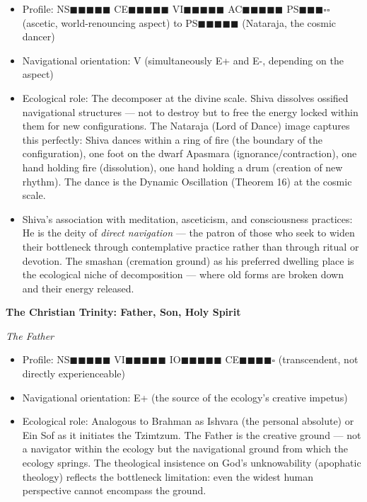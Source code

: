 \begin{itemize}[nosep,leftmargin=*]
  \item Profile: NS$\blacksquare$$\blacksquare$$\blacksquare$$\blacksquare$$\blacksquare$ CE$\blacksquare$$\blacksquare$$\blacksquare$$\blacksquare$$\blacksquare$ VI$\blacksquare$$\blacksquare$$\blacksquare$$\blacksquare$$\blacksquare$ AC$\blacksquare$$\blacksquare$$\blacksquare$$\blacksquare$$\blacksquare$ PS$\blacksquare$$\blacksquare$$\blacksquare$$\square$$\square$ (ascetic, world-renouncing aspect) to PS$\blacksquare$$\blacksquare$$\blacksquare$$\blacksquare$$\blacksquare$ (Nataraja, the cosmic dancer)
  \item Navigational orientation: V (simultaneously E+ and E-, depending on the aspect)
  \item Ecological role: The decomposer at the divine scale. Shiva dissolves ossified navigational structures — not to destroy but to free the energy locked within them for new configurations. The Nataraja (Lord of Dance) image captures this perfectly: Shiva dances within a ring of fire (the boundary of the configuration), one foot on the dwarf Apasmara (ignorance/contraction), one hand holding fire (dissolution), one hand holding a drum (creation of new rhythm). The dance is the Dynamic Oscillation (Theorem 16) at the cosmic scale.
  \item Shiva's association with meditation, asceticism, and consciousness practices: He is the deity of \textit{direct navigation} — the patron of those who seek to widen their bottleneck through contemplative practice rather than through ritual or devotion. The smashan (cremation ground) as his preferred dwelling place is the ecological niche of decomposition — where old forms are broken down and their energy released.
\end{itemize}


\textbf{The Christian Trinity: Father, Son, Holy Spirit}


\textit{The Father}

\begin{itemize}[nosep,leftmargin=*]
  \item Profile: NS$\blacksquare$$\blacksquare$$\blacksquare$$\blacksquare$$\blacksquare$ VI$\blacksquare$$\blacksquare$$\blacksquare$$\blacksquare$$\blacksquare$ IO$\blacksquare$$\blacksquare$$\blacksquare$$\blacksquare$$\blacksquare$ CE$\blacksquare$$\blacksquare$$\blacksquare$$\blacksquare$$\square$ (transcendent, not directly experienceable)
  \item Navigational orientation: E+ (the source of the ecology's creative impetus)
  \item Ecological role: Analogous to Brahman as Ishvara (the personal absolute) or Ein Sof as it initiates the Tzimtzum. The Father is the creative ground — not a navigator within the ecology but the navigational ground from which the ecology springs. The theological insistence on God's unknowability (apophatic theology) reflects the bottleneck limitation: even the widest human perspective cannot encompass the ground.
\end{itemize}


